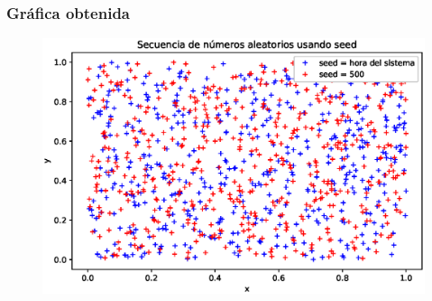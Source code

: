 \begin{frame}[fragile]
\frametitle{Gráfica obtenida}
\begin{figure}
 \centering
 \includegraphics[scale=0.5]{Imagenes/Secuencia_aleatoria_05.eps}
\end{figure}
\end{frame}

